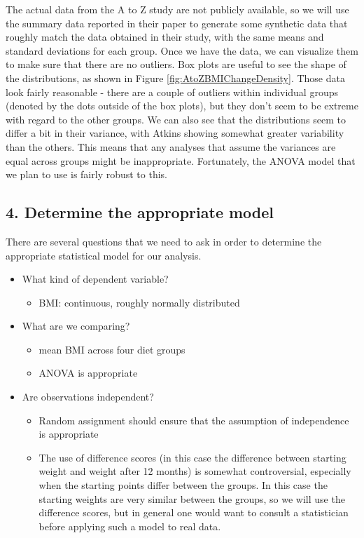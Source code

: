 \documentclass[
  12pt,
]{book}
\providecommand{\tightlist}{%
  \setlength{\itemsep}{0pt}\setlength{\parskip}{0pt}}
\begin{document}
The actual data from the A to Z study are not publicly available, so we will use the summary data reported in their paper to generate some synthetic data that roughly match the data obtained in their study, with the same means and standard deviations for each group. Once we have the data, we can visualize them to make sure that there are no outliers. Box plots are useful to see the shape of the distributions, as shown in Figure \ref{fig:AtoZBMIChangeDensity}. Those data look fairly reasonable - there are a couple of outliers within individual groups (denoted by the dots outside of the box plots), but they don't seem to be extreme with regard to the other groups. We can also see that the distributions seem to differ a bit in their variance, with Atkins showing somewhat greater variability than the others. This means that any analyses that assume the variances are equal across groups might be inappropriate. Fortunately, the ANOVA model that we plan to use is fairly robust to this.

\hypertarget{determine-the-appropriate-model}{%
\subsection{4. Determine the appropriate model}\label{determine-the-appropriate-model}}

There are several questions that we need to ask in order to determine the appropriate statistical model for our analysis.

\begin{itemize}
\tightlist
\item
  What kind of dependent variable?

  \begin{itemize}
  \tightlist
  \item
    BMI: continuous, roughly normally distributed
  \end{itemize}
\item
  What are we comparing?

  \begin{itemize}
  \tightlist
  \item
    mean BMI across four diet groups
  \item
    ANOVA is appropriate
  \end{itemize}
\item
  Are observations independent?

  \begin{itemize}
  \tightlist
  \item
    Random assignment should ensure that the assumption of independence is appropriate
  \item
    The use of difference scores (in this case the difference between starting weight and weight after 12 months) is somewhat controversial, especially when the starting points differ between the groups. In this case the starting weights are very similar between the groups, so we will use the difference scores, but in general one would want to consult a statistician before applying such a model to real data.
  \end{itemize}
\end{itemize}
\end{document}
